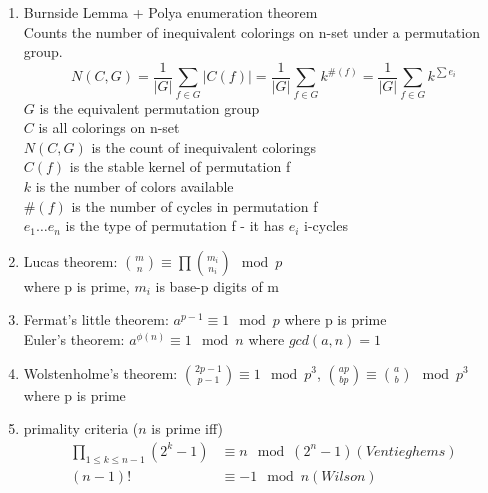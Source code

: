 \documentclass{article}
\begin{document}
\begin{enumerate}

\item Burnside Lemma + Polya enumeration theorem \\
Counts the number of inequivalent colorings on n-set under a permutation group. 
\begin{equation*}
	N(C, G) = \frac{1}{|G|} \sum_{f \in G}{|C(f)|} = \frac{1}{|G|} \sum_{f \in G}{k^{\#(f)}} = \frac{1}{|G|} \sum_{f \in G}{k^{\sum{e_i}}}
\end{equation*}
$G$ is the equivalent permutation group \\
$C$ is all colorings on n-set \\
$N(C,G)$ is the count of inequivalent colorings \\
$C(f)$ is the stable kernel of permutation f \\
$k$ is the number of colors available \\
$\#(f)$ is the number of cycles in permutation f \\
$e_1 \hdots e_n$ is the type of permutation f - it has $e_i$ i-cycles \\

\item Lucas theorem: $\binom{m}{n} \equiv \prod{\binom{m_i}{n_i}} \mod{p}$ \\
where p is prime, $m_i$ is base-p digits of m

\item Fermat's little theorem: $a^{p-1} \equiv 1 \mod{p}$ where p is prime \\
Euler's theorem: $a^{\phi(n)} \equiv 1 \mod{n}$ where $gcd(a,n) = 1$

\item Wolstenholme's theorem: $\binom{2p-1}{p-1} \equiv 1 \mod{p^3}$, $\binom{ap}{bp} \equiv \binom{a}{b} \mod{p^3}$ where p is prime

\item primality criteria ($n$ is prime iff)
\begin{align*}
	\prod_{1 \le k \le n-1}{(2^k - 1)} &\equiv n \mod{(2^n - 1)} (Ventieghems) \\
	(n-1)! &\equiv -1 \mod{n} (Wilson)
\end{align*}


\end{enumerate}
\end{document}
